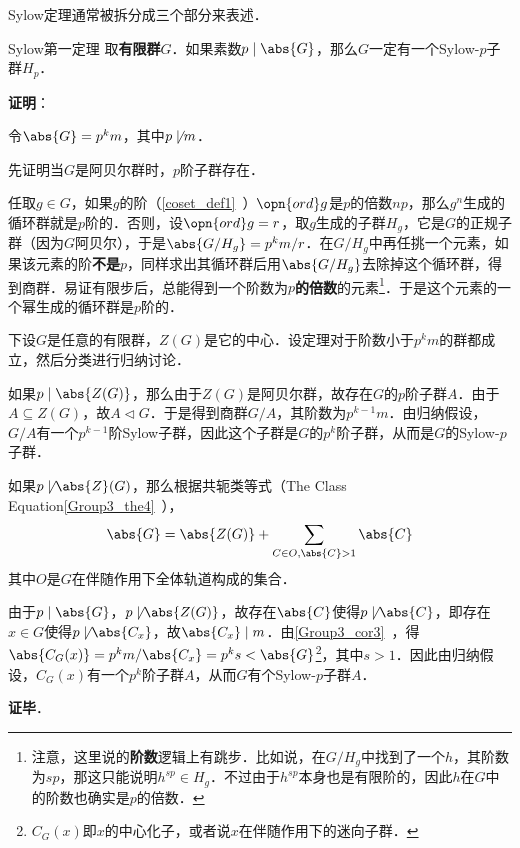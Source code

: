 Sylow定理通常被拆分成三个部分来表述．

\begin{theorem}{Sylow第一定理}
取\textbf{有限群}$G$．如果素数$p\mid\abs{G}$，那么$G$一定有一个Sylow-$p$子群$H_p$．
\end{theorem}

\textbf{证明}：

令$\abs{G}=p^km$，其中$p\not\mid m$．

先证明当$G$是阿贝尔群时，$p$阶子群存在．

任取$g\in G$，如果$g$的阶（\autoref{coset_def1}~）$\opn{ord}g$是$p$的倍数$np$，那么$g^n$生成的循环群就是$p$阶的．否则，设$\opn{ord}g=r$，取$g$生成的子群$H_g$，它是$G$的正规子群（因为$G$阿贝尔），于是$\abs{G/H_g}=p^km/r$．在$G/H_g$中再任挑一个元素，如果该元素的阶\textbf{不是}$p$，同样求出其循环群后用$\abs{G/H_g}$去除掉这个循环群，得到商群．易证有限步后，总能得到一个阶数为$p$\textbf{的倍数}的元素\footnote{注意，这里说的\textbf{阶数}逻辑上有跳步．比如说，在$G/H_g$中找到了一个$h$，其阶数为$sp$，那这只能说明$h^{sp}\in H_g$．不过由于$h^{sp}$本身也是有限阶的，因此$h$在$G$中的阶数也确实是$p$的倍数．}．于是这个元素的一个幂生成的循环群是$p$阶的．

下设$G$是任意的有限群，$Z(G)$是它的中心．设定理对于阶数小于$p^km$的群都成立，然后分类进行归纳讨论．

如果$p\mid \abs{Z(G)}$，那么由于$Z(G)$是阿贝尔群，故存在$G$的$p$阶子群$A$．由于$A\subseteq Z(G)$，故$A\vartriangleleft G$．于是得到商群$G/A$，其阶数为$p^{k-1}m$．由归纳假设，$G/A$有一个$p^{k-1}$阶Sylow子群，因此这个子群是$G$的$p^k$阶子群，从而是$G$的Sylow-$p$子群．

如果$p\not\mid \abs{Z}(G)$，那么根据共轭类等式（The Class Equation\autoref{Group3_the4}~），
\begin{equation}
\abs{G} = \abs{Z(G)} + \sum_{C\in O, \abs{C}>1} \abs{C}
\end{equation}
其中$O$是$G$在伴随作用下全体轨道构成的集合．

由于$p\mid \abs{G}$，$p\not\mid \abs{Z(G)}$，故存在$\abs{C}$使得$p\not\mid \abs{C}$，即存在$x\in G$使得$p\not\mid \abs{C_x}$，故$\abs{C_x}\mid m$．由\autoref{Group3_cor3}~，得$\abs{C_G(x)}=p^km/\abs{C_x}=p^ks<\abs{G}$\footnote{$C_G(x)$即$x$的中心化子，或者说$x$在伴随作用下的迷向子群．}，其中$s>1$．因此由归纳假设，$C_G(x)$有一个$p^k$阶子群$A$，从而$G$有个Sylow-$p$子群$A$．

\textbf{证毕}．






